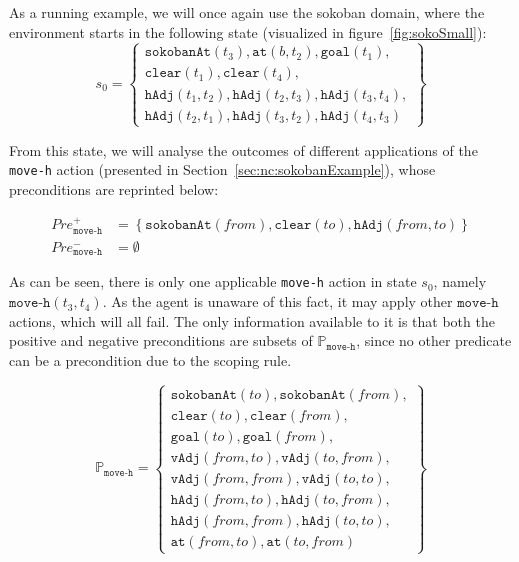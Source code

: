 \documentclass[../Master.tex]{subfiles}
\begin{document}
\begin{example}\label{ex:ncp:sokobanSetup}
    As a running example, we will once again use the sokoban domain, where the environment starts in the following state (visualized in figure~\ref{fig:sokoSmall}):
    \begin{equation*}
        s_0 =
        \left\{
            \begin{gathered}
                \texttt{sokobanAt}(t_3), \texttt{at}(b, t_2), \texttt{goal}(t_1), \\
                \texttt{clear}(t_1), \texttt{clear}(t_4), \\
                \texttt{hAdj}(t_1, t_2), \texttt{hAdj}(t_2, t_3),
                \texttt{hAdj}(t_3, t_4), \\
                \texttt{hAdj}(t_2, t_1), \texttt{hAdj}(t_3, t_2),
                \texttt{hAdj}(t_4, t_3)
            \end{gathered}
        \right\}
    \end{equation*}

    From this state, we will analyse the outcomes of different applications of the \texttt{move-h} action (presented in Section~\ref{sec:nc:sokobanExample}), whose preconditions are reprinted below:

    \begin{align*}
        Pre_{\texttt{move-h}}^+ &= \left\{
            \texttt{sokobanAt}(from), \texttt{clear}(to), \texttt{hAdj}(from, to)
            \right\} \\
        Pre_{\texttt{move-h}}^- &= \emptyset
    \end{align*}

    As can be seen, there is only one applicable \texttt{move-h} action in state $s_0$, namely $\texttt{move-h}(t_3,t_4)$. As the agent is unaware of this fact, it may apply other $\texttt{move-h}$ actions, which will all fail. The only information available to it is that both the positive and negative preconditions are subsets of $\mathbb{P}_{\texttt{move-h}}$, since no other predicate can be a precondition due to the scoping rule.

    \begin{equation*}
    \mathbb{P}_{\texttt{move-h}} =
    \left\{
        \begin{gathered}
            \texttt{sokobanAt}(to), \texttt{sokobanAt}(from), \\
            \texttt{clear}(to), \texttt{clear}(from), \\
            \texttt{goal}(to), \texttt{goal}(from), \\
            \texttt{vAdj}(from, to), \texttt{vAdj}(to, from), \\
            \texttt{vAdj}(from, from), \texttt{vAdj}(to, to), \\
            \texttt{hAdj}(from, to), \texttt{hAdj}(to, from), \\
            \texttt{hAdj}(from, from), \texttt{hAdj}(to, to), \\
            \texttt{at}(from, to), \texttt{at}(to, from)
        \end{gathered}
    \right\}
    \end{equation*}
\end{example}
\end{document}
